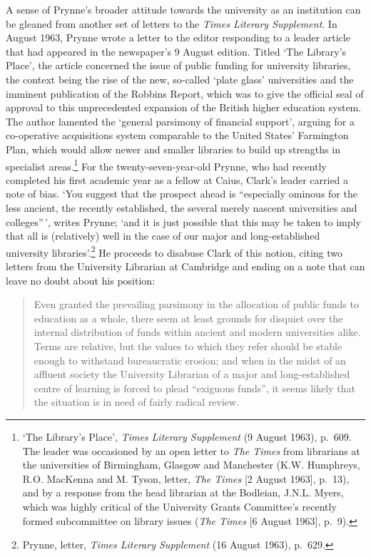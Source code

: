 \documentclass[]{article}
\begin{document}
A sense of Prynne's broader attitude towards the university as an
institution can be gleaned from another set of letters to the
\emph{Times Literary Supplement}. In August 1963, Prynne wrote a letter
to the editor responding to a leader article that had appeared in the
newspaper's 9 August edition. Titled `The Library's Place', the article
concerned the issue of public funding for university libraries, the
context being the rise of the new, so-called `plate glass' universities
and the imminent publication of the Robbins Report, which was to give
the official seal of approval to this unprecedented expansion of the
British higher education system. The author lamented the `general
parsimony of financial support', arguing for a co-operative acquisitions
system comparable to the United States' Farmington Plan, which would
allow newer and smaller libraries to build up strengths in specialist
areas.\footnote{`The Library's Place', \emph{Times Literary Supplement}
  (9 August 1963), p.~609. The leader was occasioned by an open letter
  to \emph{The Times} from librarians at the universities of Birmingham,
  Glasgow and Manchester (K.W. Humphreys, R.O. MacKenna and M. Tyson,
  letter, \emph{The Times} {[}2 August 1963{]}, p.~13), and by a
  response from the head librarian at the Bodleian, J.N.L. Myers, which
  was highly critical of the University Grants Committee's recently
  formed subcommittee on library issues (\emph{The Times} {[}6 August
  1963{]}, p.~9).} For the twenty-seven-year-old Prynne, who had
recently completed his first academic year as a fellow at Caius, Clark's
leader carried a note of bias. `You suggest that the prospect ahead is
``especially ominous for the less ancient, the recently established, the
several merely nascent universities and colleges''\,', writes Prynne;
`and it is just possible that this may be taken to imply that all is
(relatively) well in the case of our major and long-established
university libraries'.\footnote{Prynne, letter, \emph{Times Literary
  Supplement} (16 August 1963), p.~629.} He proceeds to disabuse Clark
of this notion, citing two letters from the University Librarian at
Cambridge and ending on a note that can leave no doubt about his
position:

\begin{quote}
Even granted the prevailing parsimony in the allocation of public funds
to education as a whole, there seem at least grounds for disquiet over
the internal distribution of funds within ancient and modern
universities alike. Terms are relative, but the values to which they
refer should be stable enough to withstand bureaucratic erosion; and
when in the midst of an affluent society the University Librarian of a
major and long-established centre of learning is forced to plead
``exiguous funds'', it seems likely that the situation is in need of
fairly radical review.
\end{quote}
\end{document}
